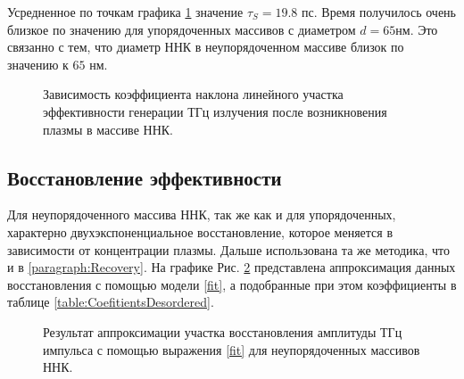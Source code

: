 \documentclass[a4paper,14pt,russian]{extreport}
\begin{document}
				Усредненное по точкам графика \ref{ris:LineCoefitientDesordered} значение $\tau_S = 19.8 \text{ пс}$. Время получилось очень близкое по значению для упорядоченных массивов с диаметром $d = 65 нм$. Это связанно с тем, что диаметр ННК в  неупорядоченном массиве близок по значению к $65$ нм. 
 				\begin{figure}[h]
					\caption{Зависимость коэффициента наклона линейного участка эффективности генерации ТГц излучения после возникновения плазмы в массиве ННК.}
				\label{ris:LineCoefitientDesordered}
				\end{figure}
			\subsection{Восстановление эффективности}
				Для неупорядоченного массива ННК, так же как и для упорядоченных, характерно двухэкспоненциальное восстановление, которое меняется в зависимости от концентрации плазмы. Дальше использована та же методика, что и в \ref{paragraph:Recovery}. На графике Рис. \ref{ris:LongAproximationsDesordered} представлена аппроксимация данных восстановления с помощью модели \ref{fit}, а подобранные при этом коэффициенты в таблице \ref{table:CoefitientsDesordered}.\par
				\begin{figure}[h]
					\caption{Результат аппроксимации участка восстановления амплитуды ТГц импульса с помощью выражения \ref{fit} для неупорядоченных массивов ННК.}
				\label{ris:LongAproximationsDesordered}
				\end{figure}
\end{document}
